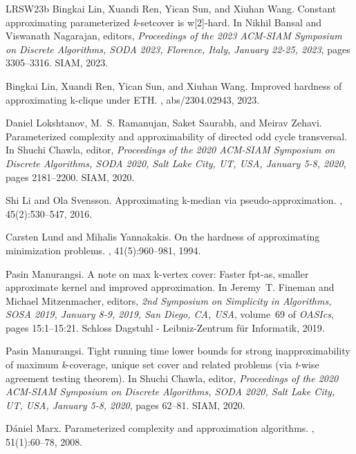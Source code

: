 \documentclass[10pt,a4paper]{article}
\begin{document}
\begin{thebibliography}{LRSW23b}
Bingkai Lin, Xuandi Ren, Yican Sun, and Xiuhan Wang.
\newblock Constant approximating parameterized \emph{k}-setcover is w[2]-hard.
\newblock In Nikhil Bansal and Viswanath Nagarajan, editors, {\em Proceedings
  of the 2023 {ACM-SIAM} Symposium on Discrete Algorithms, {SODA} 2023,
  Florence, Italy, January 22-25, 2023}, pages 3305--3316. {SIAM}, 2023.

Bingkai Lin, Xuandi Ren, Yican Sun, and Xiuhan Wang.
\newblock Improved hardness of approximating k-clique under {ETH}.
, abs/2304.02943, 2023.

Daniel Lokshtanov, M.~S. Ramanujan, Saket Saurabh, and Meirav Zehavi.
\newblock Parameterized complexity and approximability of directed odd cycle
  transversal.
\newblock In Shuchi Chawla, editor, {\em Proceedings of the 2020 {ACM-SIAM}
  Symposium on Discrete Algorithms, {SODA} 2020, Salt Lake City, UT, USA,
  January 5-8, 2020}, pages 2181--2200. {SIAM}, 2020.

Shi Li and Ola Svensson.
\newblock Approximating k-median via pseudo-approximation.
, 45(2):530--547, 2016.

Carsten Lund and Mihalis Yannakakis.
\newblock On the hardness of approximating minimization problems.
, 41(5):960--981, 1994.

Pasin Manurangsi.
\newblock A note on max k-vertex cover: Faster fpt-as, smaller approximate
  kernel and improved approximation.
\newblock In Jeremy~T. Fineman and Michael Mitzenmacher, editors, {\em 2nd
  Symposium on Simplicity in Algorithms, {SOSA} 2019, January 8-9, 2019, San
  Diego, CA, {USA}}, volume~69 of {\em OASIcs}, pages 15:1--15:21. Schloss
  Dagstuhl - Leibniz-Zentrum f{\"{u}}r Informatik, 2019.

Pasin Manurangsi.
\newblock Tight running time lower bounds for strong inapproximability of
  maximum \emph{k}-coverage, unique set cover and related problems (via
  \emph{t}-wise agreement testing theorem).
\newblock In Shuchi Chawla, editor, {\em Proceedings of the 2020 {ACM-SIAM}
  Symposium on Discrete Algorithms, {SODA} 2020, Salt Lake City, UT, USA,
  January 5-8, 2020}, pages 62--81. {SIAM}, 2020.

D{\'{a}}niel Marx.
\newblock Parameterized complexity and approximation algorithms.
, 51(1):60--78, 2008.


\end{thebibliography}
\end{document}
